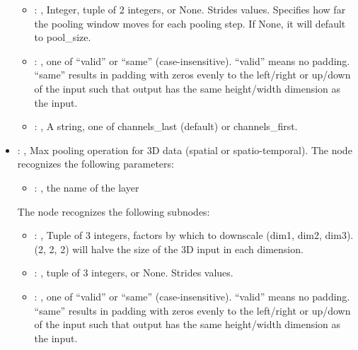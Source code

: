 \begin{itemize}
\begin{itemize}
        \item {}: , 
          Integer, tuple of 2 integers, or None. Strides values. Specifies how far the pooling
          window moves         for each pooling step. If None, it will default to pool\_size.

        \item {}: , 
          one of ``valid'' or ``same'' (case-insensitive). ``valid'' means no padding. ``same''
          results in padding         with zeros evenly to the left/right or up/down of the input
          such that output has the same height/width         dimension as the input.

        \item {}: , 
          A string, one of channels\_last (default) or channels\_first.
      \end{itemize}

    \item {}: , 
      Max pooling operation for 3D data (spatial or spatio-temporal).
      The  node recognizes the following parameters:
        \begin{itemize}
          \item {}: , 
            the name of the layer
      \end{itemize}

      The  node recognizes the following subnodes:
      \begin{itemize}
        \item {}: , 
          Tuple of 3 integers, factors by which to downscale (dim1, dim2, dim3). (2, 2, 2) will
          halve the         size of the 3D input in each dimension.

        \item {}: , 
          tuple of 3 integers, or None. Strides values.

        \item {}: , 
          one of ``valid'' or ``same'' (case-insensitive). ``valid'' means no padding. ``same''
          results in padding         with zeros evenly to the left/right or up/down of the input
          such that output has the same height/width         dimension as the input.


\end{itemize}
\end{itemize}
